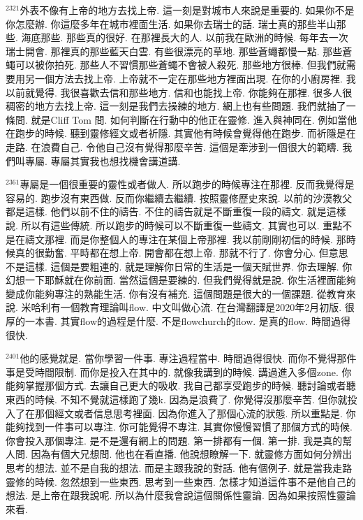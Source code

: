 \documentclass{book}
\begin{document}
$^{2321}$外表不像有上帝的地方去找上帝.
這一刻是對城市人來說是重要的.
如果你不是你怎麼辦.
你這麼多年在城市裡面生活.
如果你去瑞士的話.
瑞士真的那些半山那些.
海底那些.
那些真的很好.
在那裡長大的人.
以前我在歐洲的時候.
每年去一次瑞士開會.
那裡真的那些藍天白雲.
有些很漂亮的草地.
那些蒼蠅都慢一點.
那些蒼蠅可以被你拍死.
那些人不習慣那些蒼蠅不會被人殺死.
那些地方很棒.
但我們就需要用另一個方法去找上帝.
上帝就不一定在那些地方裡面出現.
在你的小廚房裡.
我以前就覺得.
我很喜歡去信和那些地方.
信和也能找上帝.
你能夠在那裡.
很多人很稠密的地方去找上帝.
這一刻是我們去操練的地方.
網上也有些問題.
我們就抽了一條問.
就是Cliff Tom 問.
如何判斷在行動中的他正在靈修.
進入與神同在.
例如當他在跑步的時候.
聽到靈修經文或者祈隱.
其實他有時候會覺得他在跑步.
而祈隱是在走路.
在浪費自己.
令他自己沒有覺得那麼辛苦.
這個是牽涉到一個很大的範疇.
我們叫專屬.
專屬其實我也想找機會講道講.

$^{2361}$專屬是一個很重要的靈性或者做人.
所以跑步的時候專注在那裡.
反而我覺得是容易的.
跑步沒有東西做.
反而你繼續去繼續.
按照靈修歷史來說.
以前的沙漠教父都是這樣.
他們以前不住的禱告.
不住的禱告就是不斷重復一段的禱文.
就是這樣說.
所以有這些傳統.
所以跑步的時候可以不斷重復一些禱文.
其實也可以.
重點不是在禱文那裡.
而是你整個人的專注在某個上帝那裡.
我以前剛剛初信的時候.
那時候真的很勤奮.
平時都在想上帝.
開會都在想上帝.
那就不行了.
你會分心.
但意思不是這樣.
這個是要粗連的.
就是理解你日常的生活是一個天賦世界.
你去理解.
你幻想一下耶穌就在你前面.
當然這個是要練的.
但我們覺得就是說.
你生活裡面能夠變成你能夠專注的熟能生活.
你有沒有補充.
這個問題是很大的一個課題.
從教育來說.
米哈利有一個教育理論叫flow.
中文叫做心流.
在台灣翻譯是2020年2月初版.
很厚的一本書.
其實flow的過程是什麼.
不是flowchurch的flow.
是真的flow.
時間過得很快.

$^{2401}$他的感覺就是.
當你學習一件事.
專注過程當中.
時間過得很快.
而你不覺得那件事是受時間限制.
而你是投入在其中的.
就像我講到的時候.
講過進入多個zone.
你能夠掌握那個方式.
去讓自己更大的吸收.
我自己都享受跑步的時候.
聽討論或者聽東西的時候.
不知不覺就這樣跑了幾k.
因為是浪費了.
你覺得沒那麼辛苦.
但你就投入了在那個經文或者信息思考裡面.
因為你進入了那個心流的狀態.
所以重點是.
你能夠找到一件事可以專注.
你可能覺得不專注.
其實你慢慢習慣了那個方式的時候.
你會投入那個專注.
是不是還有網上的問題.
第一排都有一個.
第一排.
我是真的幫人問.
因為有個大兄想問.
他也在看直播.
他說想瞭解一下.
就靈修方面如何分辨出思考的想法.
並不是自我的想法.
而是主跟我說的對話.
他有個例子.
就是當我走路靈修的時候.
忽然想到一些東西.
思考到一些東西.
怎樣才知道這件事不是他自己的想法.
是上帝在跟我說呢.
所以為什麼我會說這個關係性靈論.
因為如果按照性靈論來看.
\end{document}
